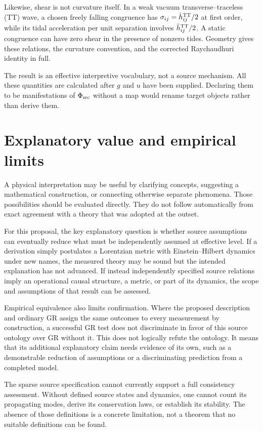 \documentclass[11pt]{article}
\begin{document}
Likewise, shear is not curvature itself. In a weak vacuum transverse--traceless (TT) wave, a chosen freely falling congruence has $\sigma_{ij}=\dot h^{\mathrm{TT}}_{ij}/2$ at first order, while its tidal acceleration per unit separation involves $\ddot h^{\mathrm{TT}}_{ij}/2$. A static congruence can have zero shear in the presence of nonzero tides. Geometry gives these relations, the curvature convention, and the corrected Raychaudhuri identity in full.

The result is an effective interpretive vocabulary, not a source mechanism. All these quantities are calculated after $g$ and $u$ have been supplied. Declaring them to be manifestations of $\Phi_{\mathrm{src}}$ without a map would rename target objects rather than derive them.

\section{Explanatory value and empirical limits}
A physical interpretation may be useful by clarifying concepts, suggesting a mathematical construction, or connecting otherwise separate phenomena. Those possibilities should be evaluated directly. They do not follow automatically from exact agreement with a theory that was adopted at the outset.

For this proposal, the key explanatory question is whether source assumptions can eventually reduce what must be independently assumed at effective level. If a derivation simply postulates a Lorentzian metric with Einstein--Hilbert dynamics under new names, the measured theory may be sound but the intended explanation has not advanced. If instead independently specified source relations imply an operational causal structure, a metric, or part of its dynamics, the scope and assumptions of that result can be assessed.

Empirical equivalence also limits confirmation. Where the proposed description and ordinary GR assign the same outcomes to every measurement by construction, a successful GR test does not discriminate in favor of this source ontology over GR without it. This does not logically refute the ontology. It means that its additional explanatory claim needs evidence of its own, such as a demonstrable reduction of assumptions or a discriminating prediction from a completed model.

The sparse source specification cannot currently support a full consistency assessment. Without defined source states and dynamics, one cannot count its propagating modes, derive its conservation laws, or establish its stability. The absence of those definitions is a concrete limitation, not a theorem that no suitable definitions can be found.
\end{document}
